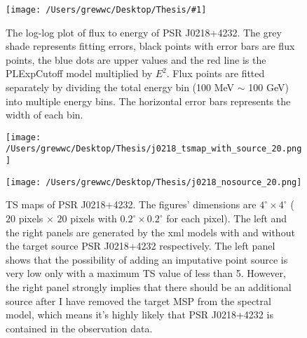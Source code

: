 \documentclass[12pt]{report}
\newcommand{\singleFig}[3]{
  \begin{figure}[!htp]
    \centering
    \texttt{[image: /Users/grewwc/Desktop/Thesis/\#1]}
    \caption{#3}
    \label{fig: #1}
  \end{figure}
}
\newcommand{\change}[1]{
  $<$\colorbox{red}{\textbf{change}}$>$#1$<$\colorbox{red}{\textbf{/change}}$>$
}
\begin{document}
            \singleFig{j0218_cur.png}{0.35}{The log-log plot of flux to energy of PSR J0218+4232. The grey shade represents 
              fitting errors, black points with error bars are flux points, the blue dots are upper values and the 
              red line is the PLExpCutoff model multiplied by $E^2$. Flux points 
              are fitted separately by dividing the total energy bin (100 MeV $\sim$ 100 GeV) into multiple energy bins.
              The horizontal error bars represents the width of each bin. }
            \vspace{1cm}
            \begin{figure}[!htp]
              \begin{center}
              \begin{minipage}{0.46\textwidth}
                \begin{center} 
                  \texttt{[image: /Users/grewwc/Desktop/Thesis/j0218\_tsmap\_with\_source\_20.png]}
                \end{center}
              \end{minipage}
              \begin{minipage}{0.45\textwidth}
                \begin{center}
                  \texttt{[image: /Users/grewwc/Desktop/Thesis/j0218\_nosource\_20.png]}
                \end{center}
              \end{minipage}
            \end{center}
            \caption{TS maps of PSR J0218+4232. The figures' dimensions are 
            $4^{\circ} \times 4^{\circ}$ ($20$ pixels $\times$ $20$ pixels with 
            $0.2^{\circ} \times 0.2^{\circ}$ for each pixel). The left and the right panels are 
            generated by the xml models with and without the target source PSR J0218+4232 respectively.
            The left panel shows that the possibility of adding an imputative point source is very low 
            only with a maximum TS value of less than 5. However, the right panel strongly implies that 
            there should be an additional source after I have removed the target MSP from the spectral 
            model, which means it's highly likely that PSR J0218+4232 is contained in the observation 
            data.}
            \label{fig: j0218_tsmap_comparison_20}
            \end{figure}
\end{document}
